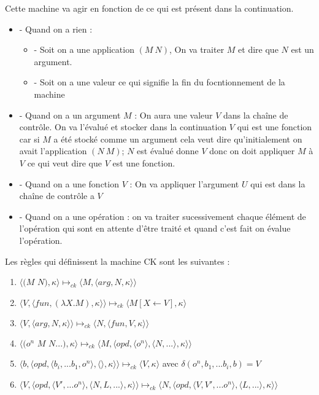 \documentclass[10pt,a4paper]{report}
\begin{document}
Cette machine va agir en fonction de ce qui est présent dans la continuation.
\begin{itemize}
\item[] - Quand on a rien :
  \begin{itemize}
  \item[] - Soit on a une application $(M~N)$, On va traiter $M$ et dire que $N$ est un argument.
  \item[] - Soit on a une valeur ce qui signifie la fin du focntionnement de la machine
  \end{itemize}
\item[] - Quand on a un argument $M$ : On aura une valeur $V$ dans la chaîne de contrôle. On va l'évalué et stocker dans la continuation $V$ qui est une fonction car si $M$ a été stocké comme un argument cela veut dire qu'initialement on avait l'application $(N~M)$; $N$ est évalué donne $V$ donc on doit appliquer $M$ à $V$ ce qui veut dire que $V$ est une fonction.
\item[] - Quand on a une fonction $V$ : On va appliquer l'argument $U$ qui est dans la chaîne de contrôle a $V$
\item[] - Quand on a une opération : on va traiter sucessivement chaque élément de l'opération qui sont en attente d'être traité et quand c'est fait on évalue l'opération. 
\end{itemize}
\bigbreak


Les règles qui définissent la machine CK sont les suivantes :
\begin{enumerate}
\item $\langle(M$ $N),\kappa\rangle \longmapsto_{ck} \langle M,\langle arg,N,\kappa\rangle\rangle$
\item $\langle V,\langle fun,(\lambda X.M),\kappa \rangle \rangle \longmapsto_{ck} \langle M[X \leftarrow V],\kappa\rangle$
\item $\langle V,\langle arg,N,\kappa \rangle \rangle \longmapsto_{ck} \langle N,\langle fun,V,\kappa \rangle \rangle$
\item $\langle(o^{n}$ $M$ $N...),\kappa\rangle \longmapsto_{ck} \langle M,\langle opd,\langle o^{n}\rangle,\langle N,...\rangle,\kappa\rangle\rangle$
\item $\langle b,\langle opd,\langle b_{i},...b_{1},o^{n}\rangle,\langle\rangle,\kappa\rangle\rangle \longmapsto_{ck} \langle V,\kappa\rangle$ avec $\delta(o^{n},b_{1},...b_{i},b) = V$
\item $\langle V,\langle opd,\langle V',...o^{n}\rangle,\langle N,L,...\rangle,\kappa\rangle\rangle \longmapsto_{ck} \langle N,\langle opd,\langle V,V',...o^{n}\rangle,\langle L,...\rangle,\kappa\rangle\rangle$
\end{enumerate}
\bigbreak
\end{document}
